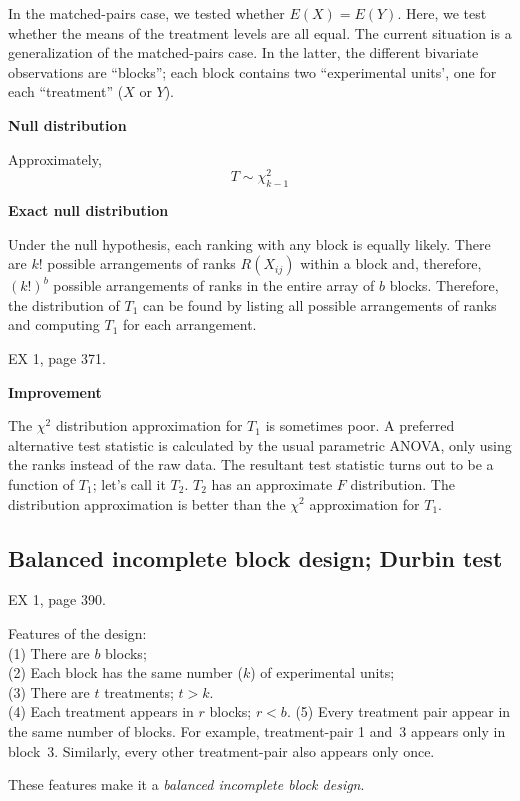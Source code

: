 \documentclass[12pt]{article}
\begin{document}
\alert
In the matched-pairs case, we tested whether $E(X) = E(Y)$.
Here, we test whether the means of the treatment levels are all equal.
The current situation is a generalization of the matched-pairs case.
In the latter, the different bivariate observations are ``blocks'';
each block contains two ``experimental units', one for each
``treatment'' ($X$ or $Y$).

\textbf{Null distribution}

Approximately,
\[
T \sim \chi^2_{k-1}
\]

\textbf{Exact null distribution}

Under the null hypothesis,
each ranking with any block is equally likely.
There are $k!$ possible arrangements of ranks $R(X_{ij})$ within a block
and, therefore, $(k!)^{b}$ possible arrangements of ranks in the entire
array of $b$ blocks.
Therefore, the distribution of $T_1$ can be found by listing all
possible arrangements of ranks and computing $T_1$ for each arrangement.

\example EX 1, page 371.

\textbf{Improvement}

The $\chi^2$ distribution approximation for $T_1$ is sometimes poor.
A preferred alternative test statistic is calculated by the usual
parametric ANOVA, only using the ranks instead of the raw data.
The resultant test statistic turns out to be a function of $T_1$;
let's call it $T_2$.
$T_2$ has an approximate $F$ distribution.
The distribution approximation is better than the $\chi^2$ approximation
for $T_1$.

\subsection{Balanced incomplete block design; Durbin test}

\example EX 1, page 390.

Features of the design:\\
(1) There are $b$ blocks;\\
(2) Each block has the same number ($k$) of experimental units;\\
(3) There are $t$ treatments; $t > k$.\\
(4) Each treatment appears in $r$ blocks; $r < b$.
(5) Every treatment pair appear in the same number of blocks. For
example, treatment-pair 1 and~3 appears only in block~3.
Similarly, every other treatment-pair also appears only once.

These features make it a \emph{balanced incomplete block design}.
\end{document}
